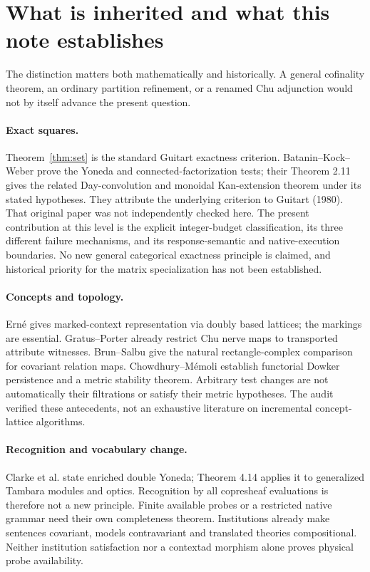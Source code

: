 \section{What is inherited and what this note establishes}\label{sec:prior}
The distinction matters both mathematically and historically. A general
cofinality theorem, an ordinary partition refinement, or a renamed Chu
adjunction would not by itself advance the present question.

\paragraph{Exact squares.}
Theorem~\ref{thm:set} is the standard Guitart exactness criterion.
Batanin--Kock--Weber \cite[Lemmas 2.2 and 2.4]{BKW} prove the Yoneda
and connected-factorization tests; their Theorem 2.11 gives the related
Day-convolution and monoidal Kan-extension theorem under its stated
hypotheses. They attribute the underlying criterion to Guitart (1980).
That original paper was not independently checked here. The present
contribution at this level is the explicit integer-budget classification,
its three different failure mechanisms, and its response-semantic and
native-execution boundaries. No new general categorical exactness principle
is claimed, and historical priority for the matrix specialization has not
been established.

\paragraph{Concepts and topology.}
Ern\'e \cite[Theorem 7.1]{Erne} gives marked-context representation via
doubly based lattices; the markings are essential. Gratus--Porter
\cite[Proposition 1(ii), Corollary 1]{GP} already restrict Chu nerve maps
to transported attribute witnesses. Brun--Salbu \cite[Definition 3.2,
Theorem 4.3]{BS} give the natural rectangle-complex comparison for
covariant relation maps. Chowdhury--M\'emoli \cite[Theorem 3,
Corollary 20, Proposition 15]{DowkerPersistence} establish functorial
Dowker persistence and a metric stability theorem. Arbitrary test changes
are not automatically their filtrations or satisfy their metric hypotheses.
The audit verified these antecedents, not an exhaustive literature on
incremental concept-lattice algorithms.

\paragraph{Recognition and vocabulary change.}
Clarke et al. \cite[Lemma 4.12]{Optics} state enriched double Yoneda;
Theorem 4.14 applies it to generalized Tambara modules and optics.
Recognition by all copresheaf evaluations is therefore not a new principle.
Finite available probes or a restricted native grammar need their own
completeness theorem. Institutions \cite[Definition 1, Theorem 11]{Institutions}
already make sentences covariant, models contravariant and translated
theories compositional. Neither institution satisfaction nor a contextad
morphism alone proves physical probe availability.

